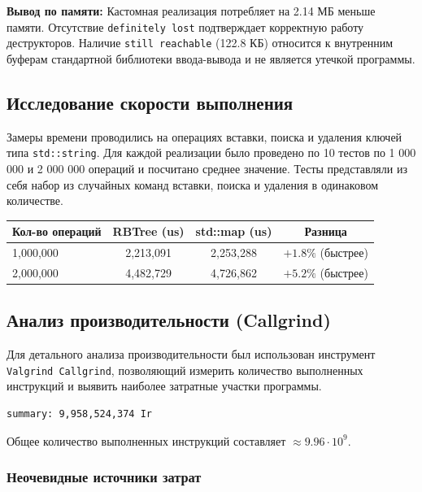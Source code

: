 \textbf{Вывод по памяти:} Кастомная реализация потребляет на 2.14 МБ меньше памяти. Отсутствие \texttt{definitely lost} подтверждает корректную работу деструкторов. Наличие \texttt{still reachable} (122.8 КБ) относится к внутренним буферам стандартной библиотеки ввода-вывода и не является утечкой программы.

\subsection{Исследование скорости выполнения}

Замеры времени проводились на операциях вставки, поиска и удаления ключей типа \texttt{std::string}. Для каждой реализации было проведено по 10 тестов по 1 000 000 и 2 000 000 операций и посчитано среднее значение.
Тесты представляли из себя набор из случайных команд вставки, поиска и удаления в одинаковом количестве.

\begin{table}[h!]
\centering
\renewcommand{\arraystretch}{1.2}
\begin{tabular}{@{}lccc@{}}
\toprule
\textbf{Кол-во операций} & \textbf{RBTree (us)} & \textbf{std::map (us)} & \textbf{Разница} \\ \midrule
1,000,000 & 2,213,091 & 2,253,288 & $+1.8\%$ (быстрее) \\
2,000,000 & 4,482,729 & 4,726,862 & $+5.2\%$ (быстрее) \\ \bottomrule
\end{tabular}
\end{table}

\subsection{Анализ производительности (Callgrind)}

Для детального анализа производительности был использован инструмент \texttt{Valgrind Callgrind}, позволяющий измерить количество выполненных инструкций и выявить наиболее затратные участки программы.

\begin{verbatim}
summary: 9,958,524,374 Ir
\end{verbatim}

Общее количество выполненных инструкций составляет $\approx 9.96 \cdot 10^9$.

\subsubsection*{Неочевидные источники затрат}

